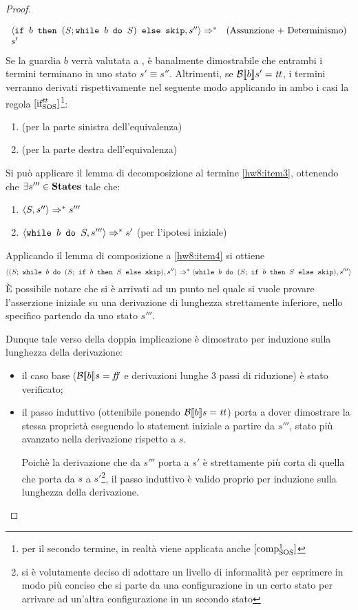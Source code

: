 \begin{proof}
\begin{itemize}
$$\begin{array}{lr}
  \langle{}\mbox{\normalfont{\texttt{if }}} b \textrm{\normalfont{\texttt{ then }}} (S;\mbox{\normalfont{\texttt{while }}} b \textrm{\normalfont{\texttt{ do }}} S) \textrm{\normalfont{\texttt{ else }}} \textrm{\normalfont{\texttt{skip}}}, s''\rangle{} \Rightarrow^{*} & (\text{Assunzione + Determinismo})\\
  s'
  \end{array}
  $$
  Se la guardia $b$ verrà valutata a \semfalse, è banalmente dimostrabile che
  entrambi i termini terminano in uno stato $s' \equiv{} s''$.
  Altrimenti, se $\mathcal{B} \llbracket b \rrbracket s' = \mbox{\textit{tt}}$, i termini verranno derivati
  rispettivamente nel seguente modo applicando in ambo i casi la regola
  $ [ \textrm{\normalfont{if}} ^ \textrm{\normalfont{\ensuremath{\mbox{\textit{tt}}}}} _\textrm{\normalfont{SOS}} ] $\footnote{per il secondo termine, in realtà viene applicata anche
  $ [ \textrm{\normalfont{comp}} ^ \textrm{\normalfont{1}} _\textrm{\normalfont{SOS}} ] $}:
  \begin{enumerate}
    \item {} (per la parte sinistra dell'equivalenza)
    \label{hw8:item3}
    \item {}
      (per la parte destra dell'equivalenza)
  \end{enumerate}
  Si può applicare il lemma di decomposizione al termine \ref{hw8:item3},
  ottenendo che $\exists{s'''} \in \mbox{\textbf{States}}$ tale che:
  \begin{enumerate}[label=(\alph*)]
    \item $\langle{}S, s''\rangle{} \Rightarrow^{*} s'''$
    \label{hw8:item4}
    \item $\langle{}\mbox{\normalfont{\texttt{while }}} b \textrm{\normalfont{\texttt{ do }}} S, s'''\rangle{} \Rightarrow^{*} s'$ (per l'ipotesi iniziale)
    \label{hw8:item5}
  \end{enumerate}
  Applicando il lemma di composizione a \ref{hw8:item4} si ottiene
  $$
  \confSs{(S;\ \wbS{b}{(S;\ \ifABC{b}{S}{\skipForFriends})}}{s''}
    \Rar{*}
  \confSs{\wbS{b}{(S;\ \ifABC{b}{S}{\skipForFriends})}}{s'''}
  $$
  È possibile notare che si è arrivati ad un punto nel quale si vuole provare
  l'asserzione iniziale su una derivazione di lunghezza strettamente inferiore,
  nello specifico partendo da uno stato $s'''$.

  Dunque tale verso della doppia implicazione è dimostrato per induzione sulla
  lunghezza della derivazione:
  \begin{itemize}
    \item il caso base ($\mathcal{B} \llbracket b \rrbracket s = \mbox{\textit{ff}}$ e derivazioni lunghe 3 passi di
      riduzione) è stato verificato;
    \item il passo induttivo (ottenibile ponendo $\mathcal{B} \llbracket b \rrbracket s = \mbox{\textit{tt}}$) porta a
      dover dimostrare la stessa proprietà eseguendo lo statement iniziale a
      partire da $s'''$, stato più avanzato nella derivazione rispetto a $s$.

      Poichè la derivazione che da $s'''$ porta a $s'$ è strettamente più
      corta di quella che porta da $s$ a $s'$\footnote{si è volutamente deciso
      di adottare un livello di informalità per esprimere in modo più
      conciso che si parte da una configurazione in un certo stato per
      arrivare ad un'altra configurazione in un secondo stato}, il passo
      induttivo è valido proprio per induzione sulla lunghezza della
      derivazione.
  \end{itemize}
\end{itemize}


\end{proof}
